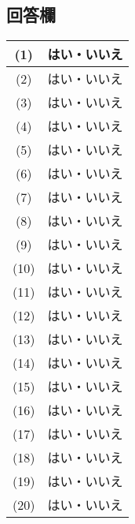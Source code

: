 \documentclass[twocolumn, 20pt]{jarticle}
\begin{document}
\subsection*{回答欄}
\begin{tabular}{|c|c|}
  \hline
  (1)\rule[0mm]{0mm}{5mm}\rule[0mm]{0mm}{5mm}&\huge{はい・いいえ}\rule[0mm]{0mm}{5mm} \\
  \hline
  (2)\rule[0mm]{0mm}{5mm}&\huge{はい・いいえ}\rule[0mm]{0mm}{5mm}\\
  \hline
  (3)\rule[0mm]{0mm}{5mm}&\huge{はい・いいえ}\rule[0mm]{0mm}{5mm}\\
  \hline
  (4)\rule[0mm]{0mm}{5mm}&\huge{はい・いいえ}\rule[0mm]{0mm}{5mm}\\
  \hline
  (5)\rule[0mm]{0mm}{5mm}&\huge{はい・いいえ}\rule[0mm]{0mm}{5mm}\\
  \hline
  (6)\rule[0mm]{0mm}{5mm}&\huge{はい・いいえ}\rule[0mm]{0mm}{5mm}\\
  \hline
  (7)\rule[0mm]{0mm}{5mm}&\huge{はい・いいえ}\rule[0mm]{0mm}{5mm}\\
  \hline
  (8)\rule[0mm]{0mm}{5mm}&\huge{はい・いいえ}\rule[0mm]{0mm}{5mm}\\
  \hline
  (9)\rule[0mm]{0mm}{5mm}&\huge{はい・いいえ}\rule[0mm]{0mm}{5mm}\\
  \hline
  (10)\rule[0mm]{0mm}{5mm}&\huge{はい・いいえ}\rule[0mm]{0mm}{5mm}\\
  \hline
  (11)\rule[0mm]{0mm}{5mm}&\huge{はい・いいえ}\rule[0mm]{0mm}{5mm}\\
  \hline
  (12)\rule[0mm]{0mm}{5mm}&\huge{はい・いいえ}\rule[0mm]{0mm}{5mm}\\
  \hline
  (13)\rule[0mm]{0mm}{5mm}&\huge{はい・いいえ}\rule[0mm]{0mm}{5mm}\\
  \hline
  (14)\rule[0mm]{0mm}{5mm}&\huge{はい・いいえ}\rule[0mm]{0mm}{5mm}\\
  \hline
  (15)\rule[0mm]{0mm}{5mm}&\huge{はい・いいえ}\rule[0mm]{0mm}{5mm}\\
  \hline
  (16)\rule[0mm]{0mm}{5mm}&\huge{はい・いいえ}\rule[0mm]{0mm}{5mm}\\
  \hline
  (17)\rule[0mm]{0mm}{5mm}&\huge{はい・いいえ}\rule[0mm]{0mm}{5mm}\\
  \hline
  (18)\rule[0mm]{0mm}{5mm}&\huge{はい・いいえ}\rule[0mm]{0mm}{5mm}\\
  \hline
  (19)\rule[0mm]{0mm}{5mm}&\huge{はい・いいえ}\rule[0mm]{0mm}{5mm}\\
  \hline
  (20)\rule[0mm]{0mm}{5mm}&\huge{はい・いいえ}\rule[0mm]{0mm}{5mm}\\
  \hline
\end{tabular}
\end{document}
